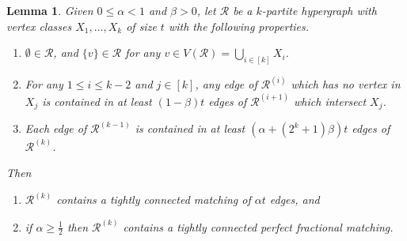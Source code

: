 \documentclass[12pt,a4paper]{amsart}
\def\itm#1{\rm ({#1})}
\def\itmit#1{\itm{\it #1\,}}
\def\rom{\itmit{\roman{*}}}
\def\abc{\itmit{\alph{*}}}
\newtheorem{lemma}[theorem] {Lemma}
\newcommand{\cR}{\mathcal{R}}
\begin{document}
\begin{lemma}\label{lem:PartConnMatch}
  Given $0\le \alpha<1$ and $\beta>0$, let $\cR$ be a $k$-partite hypergraph
 with vertex classes $X_1, \ldots, X_k$ of size $t$ with the following properties.
\begin{enumerate}[label=\rom]
\item\label{pcm:i} $\emptyset \in \cR$, and $\{v\} \in \cR$ for any $v \in V(\cR) = \bigcup_{i \in [k]} X_i$.
\item\label{pcm:ii} For any $1 \le i \le k-2$ and $j \in [k]$, any edge of $\cR^{(i)}$ which has no vertex in $X_j$ is contained in at least $(1-\beta)t$ edges of $\cR^{(i+1)}$ which
intersect $X_j$.
\item\label{pcm:iii} Each edge of $\cR^{(k-1)}$ is contained in at least 
$(\alpha+(2^k+1)\beta)t$ edges of $\cR^{(k)}$.
\end{enumerate}
Then 
 \begin{enumerate}[label=\abc]
\item\label{pcm:a} $\cR^{(k)}$ contains a tightly connected matching of $\alpha t$ edges, and
\item\label{pcm:b} if $\alpha\ge\frac{1}{2}$ then $\cR^{(k)}$ contains a tightly connected perfect fractional matching.
 \end{enumerate}
\end{lemma}
\end{document}
